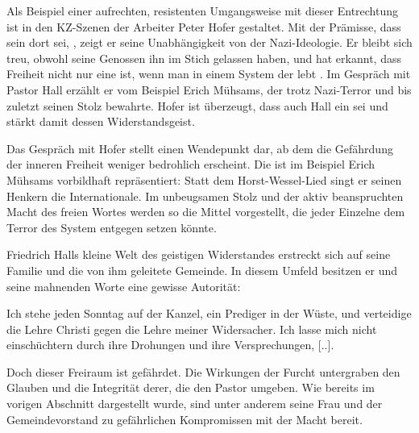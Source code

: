 Als Beispiel einer aufrechten, resistenten Umgangsweise mit dieser Entrechtung
ist in den KZ-Szenen der Arbeiter Peter Hofer gestaltet. Mit der Prämisse, dass
sein \Cite{Vaterland} dort sei, \Cite{wo Freiheit ist}
, zeigt er seine Unabhängigkeit von der Nazi-Ideologie. Er
bleibt sich treu, obwohl seine Genossen ihn im Stich gelassen haben, und hat
erkannt, dass Freiheit nicht nur eine \Cite{kleinbürgerliche Phrase} ist, wenn
man in einem System der \Cite{Sklaverei} lebt . Im
Gespräch mit Pastor Hall erzählt er vom Beispiel
Erich Mühsams, der trotz Nazi-Terror \Cite{an die Freiheit glaubte}
 und bis zuletzt seinen Stolz bewahrte. Hofer ist
überzeugt, dass auch Hall ein \Cite{Rebell} sei  und stärkt
damit dessen Widerstandsgeist.

Das Gespräch mit Hofer stellt einen Wendepunkt dar, ab dem die Gefährdung der
inneren Freiheit weniger bedrohlich erscheint. Die  ist im Beispiel Erich Mühsams vorbildhaft repräsentiert: Statt dem
Horst-Wessel-Lied singt er seinen Henkern die Internationale. Im unbeugsamen
Stolz und der aktiv beanspruchten Macht des freien Wortes werden so die Mittel
vorgestellt, die jeder Einzelne dem Terror des System entgegen setzen
könnte.
 

Friedrich Halls kleine Welt des geistigen Widerstandes erstreckt sich auf
seine Familie und die von ihm geleitete Gemeinde. In diesem
Umfeld besitzen er und seine mahnenden Worte eine gewisse Autorität:

\begin{BlockQuote}
  Ich stehe jeden Sonntag auf der Kanzel, ein Prediger in der Wüste, und
  verteidige die Lehre Christi gegen die Lehre meiner Widersacher. Ich lasse
  mich nicht einschüchtern durch ihre Drohungen und ihre Versprechungen,
  [..]. 
\end{BlockQuote}
Doch dieser Freiraum ist gefährdet. Die Wirkungen der Furcht untergraben den
Glauben und die Integrität derer, die den Pastor umgeben. Wie bereits im vorigen
Abschnitt dargestellt wurde, sind unter anderem seine Frau und der Gemeindevorstand
zu gefährlichen Kompromissen mit der Macht bereit.

